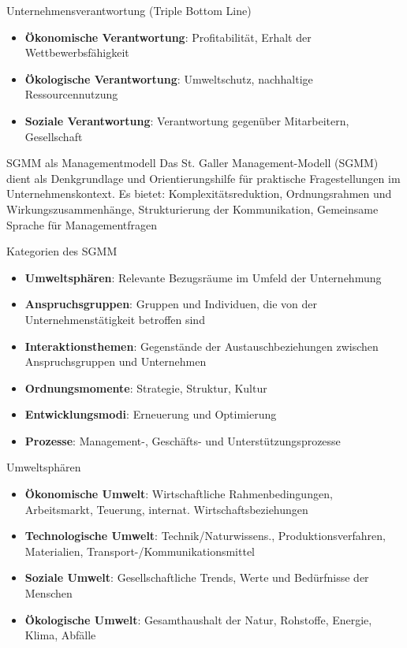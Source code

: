 \begin{theorem}{Unternehmensverantwortung} (Triple Bottom Line)
\begin{itemize}
    \item \textbf{Ökonomische Verantwortung}: Profitabilität, Erhalt der Wettbewerbsfähigkeit
    \item \textbf{Ökologische Verantwortung}: Umweltschutz, nachhaltige Ressourcennutzung
    \item \textbf{Soziale Verantwortung}: Verantwortung gegenüber Mitarbeitern, Gesellschaft
\end{itemize}
\end{theorem}

\multend

\begin{KR}{SGMM als Managementmodell}
Das St. Galler Management-Modell (SGMM) dient als Denkgrundlage und Orientierungshilfe für praktische Fragestellungen im Unternehmenskontext. Es bietet:
Komplexitätsreduktion, Ordnungsrahmen und Wirkungszusammenhänge, Strukturierung der Kommunikation, Gemeinsame Sprache für Managementfragen
\end{KR}

\begin{theorem}{Kategorien des SGMM}
\begin{itemize}
    \item \textbf{Umweltsphären}: Relevante Bezugsräume im Umfeld der Unternehmung
    \item \textbf{Anspruchsgruppen}: Gruppen und Individuen, die von der Unternehmenstätigkeit betroffen sind
    \item \textbf{Interaktionsthemen}: Gegenstände der Austauschbeziehungen zwischen Anspruchsgruppen und Unternehmen
    \item \textbf{Ordnungsmomente}: Strategie, Struktur, Kultur
    \item \textbf{Entwicklungsmodi}: Erneuerung und Optimierung
    \item \textbf{Prozesse}: Management-, Geschäfts- und Unterstützungsprozesse
\end{itemize}
\end{theorem}

\raggedcolumns

\begin{corollary}{Umweltsphären}
\begin{itemize}
    \item \textbf{Ökonomische Umwelt}: Wirtschaftliche Rahmenbedingungen, Arbeitsmarkt, Teuerung, internat. Wirtschaftsbeziehungen
    \item \textbf{Technologische Umwelt}: Technik/Naturwissens., Produktionsverfahren, Materialien, Transport-/Kommunikationsmittel
    \item \textbf{Soziale Umwelt}: Gesellschaftliche Trends, Werte und Bedürfnisse der Menschen
    \item \textbf{Ökologische Umwelt}: Gesamthaushalt der Natur, Rohstoffe, Energie, Klima, Abfälle
\end{itemize}
\end{corollary}

